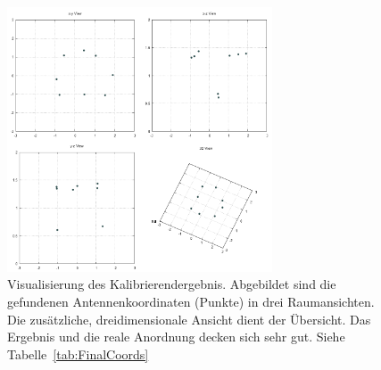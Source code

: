 \begin{figure}[ht!]
         \centering
         \includegraphics[width=0.7\textwidth]{img/calibration/calibration_results.png}
         \caption[Visualisierung des Kalibrierendergebnis]{Visualisierung des Kalibrierendergebnis. Abgebildet sind die gefundenen Antennenkoordinaten (Punkte) in drei Raumansichten. Die zusätzliche, dreidimensionale  Ansicht dient der Übersicht. Das Ergebnis und die reale Anordnung decken sich sehr gut. Siehe Tabelle~\ref{tab:FinalCoords}}
         \label{fig:3dplot_coordinates}
%
\end{figure}
%
